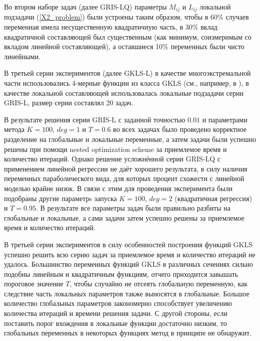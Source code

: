\documentclass{aip-cp}
\begin{document}
Во втором наборе задач (далее GRIS-LQ) параметры $M_{ij}$ и $L_{ij}$ локальной подзадачи (\ref{X2_problem}) были устроены таким образом, чтобы в 60\% случаев переменная имела несущественную квадратичную часть, в 30\% вклад квадратичной составляющей был существенным (как минимум, соизмеримым со вкладом линейной составляющей), а оставшиеся 10\% переменных были чисто линейными.

В третьей серии экспериментов (далее GKLS-L) в качестве многоэкстремальной части использовались 4-мерные функции из класса GKLS (см., например, в \cite{Sergeyev2015,Grishagin2018}), в качестве локальной составляющей использовалась локальные подзадачи серии GRIS-L, размер серии составлял 20 задач.

В результате решения серии GRIS-L с заданной точностью $0.01$ и параметрами метода $K=100$, $deg=1$ и $T=0.6$ во всех задачах было проведено корректное разделение на глобальные и локальные переменные, а затем задачи были успешно решены при помощи nested optimization scheme за приемлемое время и количество итераций. Однако решение усложнённой серии GRIS-LQ с применением линейной регрессии не даёт хорошего результата, в силу наличия переменных параболического вида, для которых процент схожести с линейной моделью крайне низок. В связи с этим для проведения эксперимента были подобраны другие параметрs запуска $K=100$, $deg=2$ (квадратичная регрессия) и $T=0.95$. В результате все параметры задач были правильно разбиты на глобальные и локальные, а сами задачи затем успешно решены за приемлемое время и количество итераций.
 

В третьей серии экспериментов в силу особенностей построения функций GKLS успешно решить всю серию задач за приемлемое время и количество итераций не удалось. Большинство переменных функций GKLS в различных сечениях сильно подобны линейным и квадратичным функциям, отчего приходится завышать пороговое значение $T$, чтобы случайно не отсеять глобальную переменную, как следствие часть локальных параметров также выносятся в глобальные. Большое количество глобальных параметров закономерно способствует увеличению количества итераций и времени решения задачи. С другой стороны, если поставить порог вхождения в локальные функции достаточно низким, то глобальных переменных в некоторых функциях метод в принципе не обнаружит.
\end{document}
